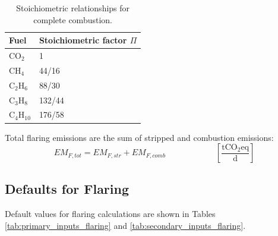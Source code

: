\documentclass[11pt]{report}
\newcommand{\eqnunitfrac}[2]{\quad\quad \scriptstyle{\left[\frac{\text{#1}}{\text{#2}}\right]}}
\begin{document}
\begin{table}
\begin{scriptsize}
\caption{Stoichiometric relationships for complete combustion.}
\label{tab:stoichiometric_relationships}
\begin{tabular*}{0.75\columnwidth}{p{}p{}}
\toprule
Fuel & Stoichiometric factor $\Pi$ \\
\midrule
CO$_2$ & 1 \\
CH$_{4}$ & 44/16 \\
C$_{2}$H$_{6}$ & 88/30 \\
C$_{3}$H$_{8}$ & 132/44 \\
C$_{4}$H$_{10}$ & 176/58 \\
\bottomrule
\end{tabular*}
\end{scriptsize}
\end{table}

Total flaring emissions are the sum of stripped and combustion emissions:
\begin{equation} \label{eq:flare_emissions_total}
EM_{F,tot} = EM_{F,str} + EM_{F,comb} \quad \quad \quad\quad\eqnunitfrac{tCO$_{2}$eq}{d}
\end{equation}

\subsection{Defaults for Flaring}

Default values for flaring calculations are shown in Tables \ref{tab:primary_inputs_flaring} and \ref{tab:secondary_inputs_flaring}.

\end{document}
